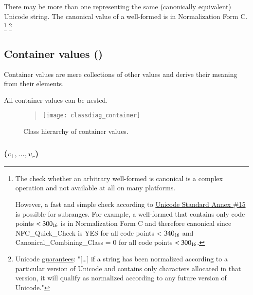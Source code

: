 There may be more than one \DborUtfEightStringValue{} representing the same (canonically equivalent) Unicode string.
The canonical value of a well-formed \DborUtfEightStringValue{} is in Normalization Form C.%
\footnote{
    The check whether an arbitrary well-formed \DborUtfEightStringValue{} is canonical
    is a complex operation and not available at all on many platforms.

    However, a fast and simple check according to
    \href{https://unicode.org/reports/tr15/\#Detecting_Normalization_Forms}{Unicode Standard Annex \#15}
    is possible for subranges.
    For example, a well-formed \DborUtfEightStringValue{} that contains only code points $< \mathrm{300}_{16}$ is
    in Normalization Form C and therefore canonical
    since NFC\_Quick\_Check is YES for all code points < $\mathrm{340}_{16}$ and Canonical\_Combining\_Class = 0
    for all code points $< \mathrm{300}_{16}$.
}%
\footnote{%
  Unicode \href{https://unicode.org/reports/tr15/\#Stability_of_Normalized_Forms}{guarantees}:
  "[\dots] if a string has been normalized according to a particular version of Unicode and contains only
  characters allocated in that version, it will qualify as normalized according to any future version of Unicode."
}


\subsection{Container values (\DborContainerValue)}
\label{sec:containervalues}
\hypertarget{sec:def:ContainerValue}{}

Container values are mere collections of other values and derive their meaning from their elements.

All container values can be nested.

\begin{figure}[H]
    \begin{quote}
        \noindent
        \texttt{[image: classdiag\_container]}%
        \caption{Class hierarchy of container values.}
        \label{fig:class:ContainerValue}
    \end{quote}
\end{figure}


\subsubsection{\DborSequenceValue(\texorpdfstring{$v_1, \ldots, v_r$}{v1, ...m vr})}
\hypertarget{sec:def:SequenceValue}{}


